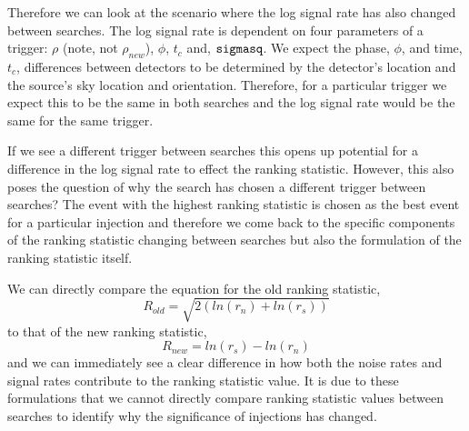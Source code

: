 Therefore we can look at the scenario where the log signal rate has also changed between searches. The log signal rate is dependent on four parameters of a trigger: $\rho$ (note, not $\rho_{new}$), $\phi$, $t_{c}$ and, $\verb|sigmasq|$. We expect the phase, $\phi$, and time, $t_{c}$, differences between detectors to be determined by the detector's location and the source's sky location and orientation. Therefore, for a particular trigger we expect this to be the same in both searches and the log signal rate would be the same for the same trigger.

If we see a different trigger between searches this opens up potential for a difference in the log signal rate to effect the ranking statistic. However, this also poses the question of why the search has chosen a different trigger between searches? The event with the highest ranking statistic is chosen as the best event for a particular injection and therefore we come back to the specific components of the ranking statistic changing between searches but also the formulation of the ranking statistic itself. 


We can directly compare the equation for the old ranking statistic,
%
\begin{equation}
    R_{old} = \sqrt{2(ln(r_n) + ln(r_s))}
\label{eqn:pycbclive-old-ranking-statistic}
\end{equation}
%
to that of the new ranking statistic,
%
\begin{equation}
    R_{new} =  ln(r_s) - ln(r_n)
\label{eqn:pycbclive-new-ranking-statistic-simple}
\end{equation}
%
and we can immediately see a clear difference in how both the noise rates and signal rates contribute to the ranking statistic value. It is due to these formulations that we cannot directly compare ranking statistic values between searches to identify why the significance of injections has changed.

